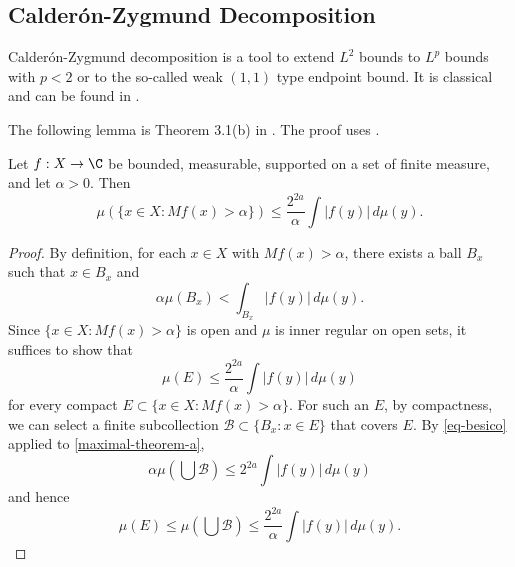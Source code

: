 \subsection{Calder\'on-Zygmund Decomposition}
\label{subsec-CZD}
Calder\'on-Zygmund decomposition is a tool to extend $L^2$ bounds to $L^p$ bounds with $p<2$ or to the so-called weak $(1, 1)$ type endpoint bound.
It is classical and can be found in \cite{stein-book}.

The following lemma is Theorem 3.1(b) in \cite{stein-book}. The proof uses .
\begin{lemma}
    \label{maximal-theorem}
    \leanok
    Let $f: X \to \C$ be bounded, measurable, supported on a set of finite measure, and let $\alpha > 0$. Then
    \begin{equation}
        \label{maximal-theorem-equation}
        \mu(\{x\in X : Mf(x) > \alpha\}) \le \frac{2^{2a}}{\alpha} \int |f(y)|\, d\mu(y).
    \end{equation}
\end{lemma}
\begin{proof}
    \leanok
    By definition, for each $x\in X$ with $Mf(x) > \alpha$, there exists a ball $B_x$ such that $x\in B_x$ and
    \begin{equation}
        \label{maximal-theorem-a}
        \alpha \mu(B_x) < \int_{B_x} |f(y)|\, d\mu(y).
    \end{equation}
    Since $\{x\in X : Mf(x) > \alpha\}$ is open and $\mu$ is inner regular on open sets, it suffices to show that
    \begin{equation*}
        \mu(E) \le \frac{2^{2a}}{\alpha} \int |f(y)|\, d\mu(y)
    \end{equation*}
    for every compact $E\subset \{x\in X : Mf(x) > \alpha\}$.
    For such an $E$, by compactness, we can select a finite subcollection $\mathcal{B} \subset \{B_x: x\in E\}$ that covers $E$.
    By \eqref{eq-besico} applied to \eqref{maximal-theorem-a},
    \begin{equation}
        \alpha \mu(\bigcup \mathcal{B}) \le 2^{2a} \int |f(y)|\,d\mu(y)
    \end{equation}
    and hence
    \begin{equation*}
        \mu(E) \le \mu(\bigcup \mathcal{B}) \le \frac{2^{2a}}{\alpha} \int |f(y)|\,d\mu(y).
    \end{equation*}
\end{proof}

